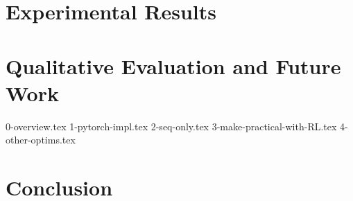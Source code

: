 \documentclass[12pt,twoside]{report}
\begin{document}
\chapter{Experimental Results}

\chapter{Qualitative Evaluation and Future Work}
{0-overview.tex}
{1-pytorch-impl.tex}
{2-seq-only.tex}
{3-make-practical-with-RL.tex}
{4-other-optims.tex}

\chapter{Conclusion}



\end{document}
